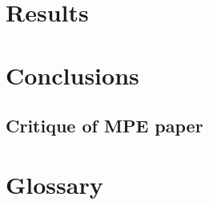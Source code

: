 \documentclass[mscthesis]{usiinfthesis}
\begin{document}









\chapter{Results}\label{chap:results}


\chapter{Conclusions}\label{chap:conclusions}

\section{Critique of MPE paper}



\appendix %


\backmatter

\chapter{Glossary} %

%
%



\end{document}
